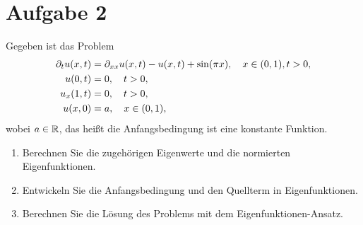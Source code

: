 \documentclass{exercise}
\begin{document}
    \section*{Aufgabe 2}

    \begin{problem}
        Gegeben ist das Problem
        \begin{align*}
            \partial_t u\parentheses*{x, t} &= \partial_{xx}u\parentheses*{x, t} - u\parentheses*{x, t} + \sin\parentheses*{\pi x}, \quad x \in \parentheses*{0, 1}, t > 0,\\
            u\parentheses*{0, t} &= 0, \quad t > 0,\\
            u_x\parentheses*{1, t} &= 0, \quad t > 0,\\
            u\parentheses*{x, 0} &= a, \quad x \in \parentheses*{0, 1},
        \end{align*}
        wobei \(a \in \mathbb{R}\), das heißt die Anfangsbedingung ist eine konstante Funktion.
        \begin{enumerate}
            \item Berechnen Sie die zugehörigen Eigenwerte und die normierten Eigenfunktionen.
            \item Entwickeln Sie die Anfangsbedingung und den Quellterm in Eigenfunktionen.
            \item Berechnen Sie die Lösung des Problems mit dem Eigenfunktionen-Ansatz.
        \end{enumerate}
    \end{problem}
\end{document}
